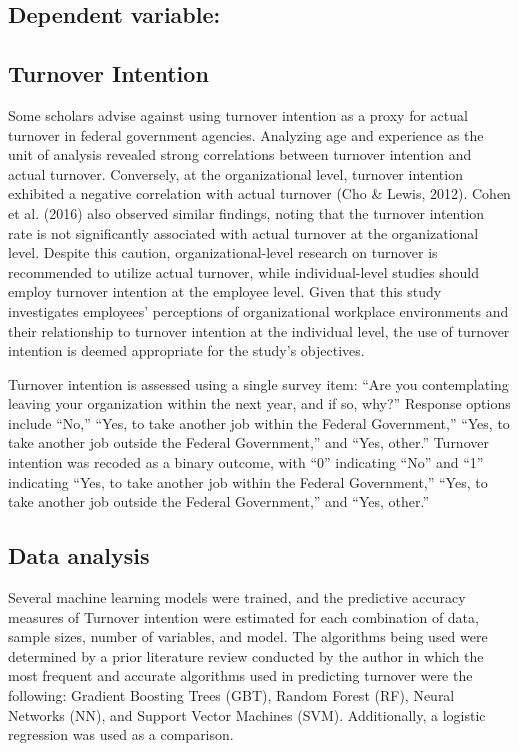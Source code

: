\documentclass[
  man]{apa7}
\begin{document}
\subsection{Dependent variable:}\label{dependent-variable}

\subsection{Turnover Intention}\label{turnover-intention}

Some scholars advise against using turnover intention as a proxy for actual turnover in federal government agencies.
Analyzing age and experience as the unit of analysis revealed strong correlations between turnover intention and actual turnover.
Conversely, at the organizational level, turnover intention exhibited a negative correlation with actual turnover (Cho \& Lewis, 2012).
Cohen et al. (2016) also observed similar findings, noting that the turnover intention rate is not significantly associated with actual turnover at the organizational level.
Despite this caution, organizational-level research on turnover is recommended to utilize actual turnover, while individual-level studies should employ turnover intention at the employee level.
Given that this study investigates employees' perceptions of organizational workplace environments and their relationship to turnover intention at the individual level, the use of turnover intention is deemed appropriate for the study's objectives.

Turnover intention is assessed using a single survey item: ``Are you contemplating leaving your organization within the next year, and if so, why?'' Response options include ``No,'' ``Yes, to take another job within the Federal Government,'' ``Yes, to take another job outside the Federal Government,'' and ``Yes, other.'' Turnover intention was recoded as a binary outcome, with ``0'' indicating ``No'' and ``1'' indicating ``Yes, to take another job within the Federal Government,'' ``Yes, to take another job outside the Federal Government,'' and ``Yes, other.''

\subsection{Data analysis}\label{data-analysis}

Several machine learning models were trained, and the predictive accuracy measures of Turnover intention were estimated for each combination of data, sample sizes, number of variables, and model.
The algorithms being used were determined by a prior literature review conducted by the author in which the most frequent and accurate algorithms used in predicting turnover were the following: Gradient Boosting Trees (GBT), Random Forest (RF), Neural Networks (NN), and Support Vector Machines (SVM).
Additionally, a logistic regression was used as a comparison.
\end{document}

